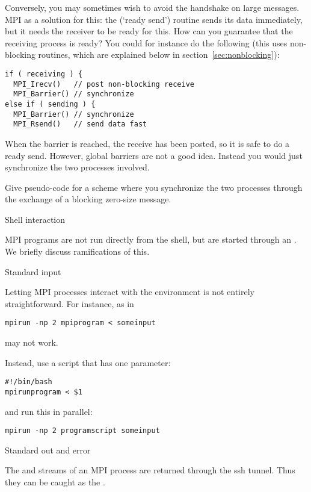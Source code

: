 Conversely, you may sometimes wish to avoid the handshake on large
messages. MPI as a solution for this: the  (`ready
send') routine sends its data immediately, but it needs the receiver
to be ready for this. How can you guarantee that the receiving process
is ready? You could for instance do the following (this uses
non-blocking routines, which are explained below in
section~\ref{sec:nonblocking}):
\begin{lstlisting}
if ( receiving ) {
  MPI_Irecv()   // post non-blocking receive
  MPI_Barrier() // synchronize
else if ( sending ) {
  MPI_Barrier() // synchronize
  MPI_Rsend()   // send data fast
\end{lstlisting}
When the barrier is reached, the receive has been posted, so it is safe 
to do a ready send. However, global barriers are not a good idea.
Instead you would just synchronize the two processes involved.
\begin{exercise}
  Give pseudo-code for a scheme where you synchronize the two
  processes through the exchange of a blocking zero-size message.
\end{exercise}

 {Shell interaction}

MPI programs are not run directly from the shell, but are started
through an . We briefly discuss
ramifications of this.

 {Standard input}
\label{sec:mpi-stdin}

Letting MPI processes interact with the environment is not entirely
straightforward.
For instance,
%
as in
\begin{verbatim}
mpirun -np 2 mpiprogram < someinput
\end{verbatim}
may not work.

Instead, use a script  that has one parameter:
\begin{verbatim}
#!/bin/bash
mpirunprogram < $1
\end{verbatim}
and run this in parallel:
\begin{verbatim}
mpirun -np 2 programscript someinput
\end{verbatim}

 {Standard out and error}

The  and  streams of an MPI
process are returned through the ssh tunnel. Thus they can be caught
as the .

